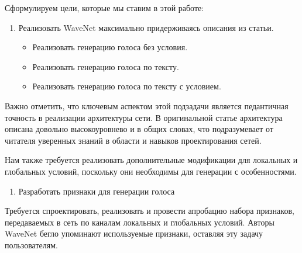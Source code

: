 \documentclass[../diploma.tex]{subfiles}
\begin{document}
Сформулируем цели, которые мы ставим в этой работе:

\begin{enumerate}
    \item Реализовать WaveNet максимально придерживаясь описания из статьи.
    \begin{itemize}
        \item Реализовать генерацию голоса без условия.
        \item Реализовать генерацию голоса по тексту.
        \item Реализовать генерацию голоса по тексту с условием.
    \end{itemize}    
\end{enumerate}

Важно отметить, что ключевым аспектом этой подзадачи является педантичная точность в реализации архитектуры сети.
В оригинальной статье архитектура описана довольно высокоуровнево и в общих словах, что подразумевает от читателя уверенных знаний в области и навыков проектирования сетей.

Нам также требуется реализовать дополнительные модификации для локальных и глобальных условий, поскольку они необходимы для генерации с особенностями.



\begin{enumerate}[resume]
    \item Разработать признаки для генерации голоса
\end{enumerate}

Требуется спроектировать, реализовать и провести апробацию набора признаков, передаваемых в сеть по каналам локальных и глобальных условий. Авторы WaveNet бегло упоминают используемые признаки, оставляя эту задачу пользователям. 
\end{document}
